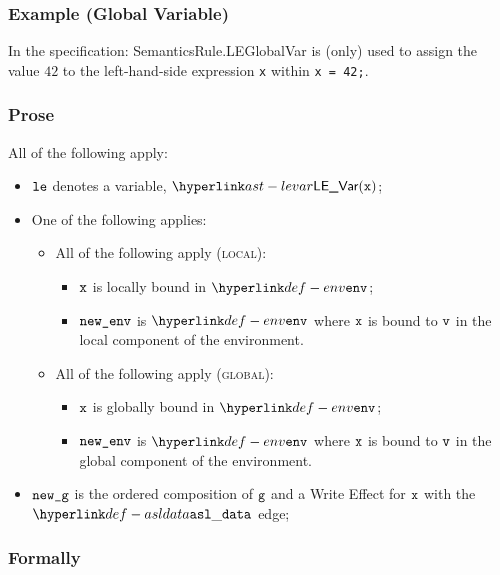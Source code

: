 \subsubsection{Example (Global Variable)}
In the specification:
SemanticsRule.LEGlobalVar is (only) used to assign the value $42$ to the left-hand-side expression
\texttt{x} within \texttt{x = 42;}.

\subsubsection{Prose}
All of the following apply:
\begin{itemize}
    \item $\vle$ denotes a variable, $\LEVar(\vx)$;
    \item One of the following applies:
    \begin{itemize}
        \item All of the following apply (\textsc{local}):
        \begin{itemize}
            \item $\vx$ is locally bound in $\env$;
            \item $\newenv$ is $\env$ where $\vx$ is bound to $\vv$ in the local component of the environment.
        \end{itemize}

        \item All of the following apply (\textsc{global}):
        \begin{itemize}
            \item $\vx$ is globally bound in $\env$;
            \item $\newenv$ is $\env$ where $\vx$ is bound to $\vv$ in the global component of the environment.
        \end{itemize}
    \end{itemize}
    \item $\newg$ is the ordered composition of $\vg$ and a Write Effect for $\vx$ with the $\asldata$ edge;
\end{itemize}

\subsubsection{Formally}
\begin{mathpar}
\end{mathpar}

